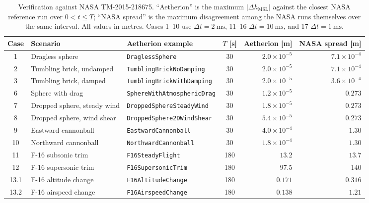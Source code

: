 \documentclass[a4paper,10pt]{article}
\newcommand{\code}[1]{\texttt{\small #1}}
\theoremstyle{definition}
\begin{document}
\begin{table}[h]
  \centering
  \caption{Verification against NASA TM-2015-218675.  ``Aetherion'' is the
    maximum $\lvert\Delta h_{\mathrm{MSL}}\rvert$ against the closest NASA
    reference run over $0 < t \leq T$; ``NASA spread'' is the maximum
    disagreement among the NASA runs themselves over the same interval.  All
    values in metres.  Cases 1--10 use $\Delta t = \SI{2}{\milli\second}$,
    11--16 $\Delta t = \SI{10}{\milli\second}$, and 17
    $\Delta t = \SI{1}{\milli\second}$.}
  \label{tab:verification}
  \small
  \begin{tabular}{cllcrr}
    \toprule
    Case & Scenario & Aetherion example & $T$ [s] & Aetherion [m] & NASA spread [m] \\
    \midrule
     1 & Dragless sphere              & \code{DraglessSphere}            & 30  & $2.0\times10^{-5}$ & $7.1\times10^{-4}$ \\
     2 & Tumbling brick, undamped     & \code{TumblingBrickNoDamping}    & 30  & $2.0\times10^{-5}$ & $7.1\times10^{-4}$ \\
     3 & Tumbling brick, damped       & \code{TumblingBrickWithDamping}  & 30  & $2.0\times10^{-5}$ & $3.6\times10^{-4}$ \\
     6 & Sphere with drag             & \code{SphereWithAtmosphericDrag} & 30  & $1.2\times10^{-5}$ & $0.273$ \\
     7 & Dropped sphere, steady wind  & \code{DroppedSphereSteadyWind}   & 30  & $1.8\times10^{-5}$ & $0.273$ \\
     8 & Dropped sphere, wind shear   & \code{DroppedSphere2DWindShear}  & 30  & $5.4\times10^{-5}$ & $0.273$ \\
     9 & Eastward cannonball          & \code{EastwardCannonball}        & 30  & $4.0\times10^{-4}$ & $1.30$ \\
    10 & Northward cannonball         & \code{NorthwardCannonball}       & 30  & $1.8\times10^{-4}$ & $1.30$ \\
    11 & F-16 subsonic trim           & \code{F16SteadyFlight}           & 180 & $13.2$  & $13.7$  \\
    12 & F-16 supersonic trim         & \code{F16SupersonicTrim}         & 180 & $97.5$  & $140$   \\
    13.1 & F-16 altitude change       & \code{F16AltitudeChange}         & 180 & $0.171$ & $0.316$ \\
    13.2 & F-16 airspeed change       & \code{F16AirspeedChange}         & 180 & $0.138$ & $1.21$  \\

\end{tabular}
\end{table}
\end{document}
